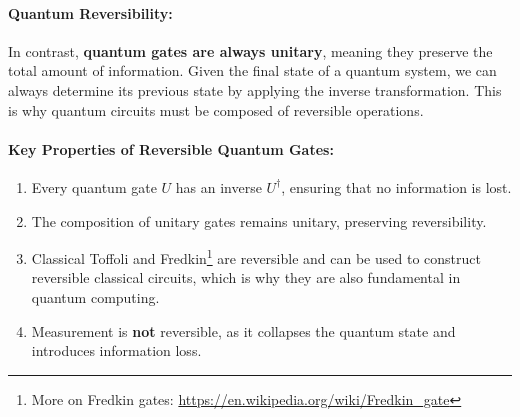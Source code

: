 \paragraph{Quantum Reversibility:}
In contrast, \textbf{quantum gates are always unitary}, meaning they
preserve the total amount of information. Given the final state of a
quantum system, we can always determine its previous state by applying the
inverse transformation. This is why quantum circuits must be composed of
reversible operations.


\paragraph{Key Properties of Reversible Quantum Gates:}
\begin{enumerate}
  \item Every quantum gate \( U \) has an inverse \( U^\dagger \), ensuring
    that no information is lost.
  \item The composition of unitary gates remains unitary, preserving
    reversibility.
  \item Classical Toffoli and Fredkin\footnote{More on Fredkin gates: \url{https://en.wikipedia.org/wiki/Fredkin_gate}}
    are reversible and can be used to construct reversible classical circuits,
    which is why they are also fundamental in quantum computing.
  \item Measurement is \textbf{not} reversible, as it collapses the quantum
    state and introduces information loss.
\end{enumerate}

